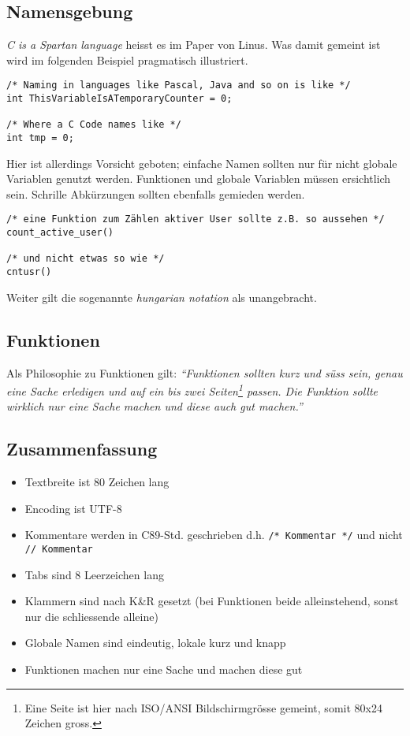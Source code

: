 \subsection{Namensgebung}
\emph{C is a Spartan language} heisst es im Paper von Linus. Was damit
gemeint ist wird im folgenden Beispiel pragmatisch illustriert.

\begin{lstlisting}
/* Naming in languages like Pascal, Java and so on is like */
int ThisVariableIsATemporaryCounter = 0;

/* Where a C Code names like */
int tmp = 0;
\end{lstlisting}

Hier ist allerdings Vorsicht geboten; einfache Namen sollten nur für nicht
globale Variablen genutzt werden. Funktionen und globale Variablen müssen
ersichtlich sein. Schrille Abkürzungen sollten ebenfalls gemieden werden.

\begin{lstlisting}
/* eine Funktion zum Zählen aktiver User sollte z.B. so aussehen */
count_active_user()

/* und nicht etwas so wie */
cntusr()
\end{lstlisting}

Weiter gilt die sogenannte \emph{hungarian notation} als unangebracht.

\subsection{Funktionen}
Als Philosophie zu Funktionen gilt: \emph{``Funktionen sollten kurz und
süss sein, genau eine Sache erledigen und auf ein bis zwei 
Seiten\footnote{
    Eine Seite ist hier nach ISO/ANSI Bildschirmgrösse gemeint, somit 
    80x24 Zeichen gross.} passen. Die Funktion sollte wirklich nur eine 
Sache machen und diese auch gut machen.''}

\subsection{Zusammenfassung}
\begin{itemize}
    \item Textbreite ist 80 Zeichen lang
    \item Encoding ist UTF-8
    \item Kommentare werden in C89-Std. geschrieben 
          d.h. \verb?/* Kommentar */? und nicht \verb?// Kommentar?
    \item Tabs sind 8 Leerzeichen lang
    \item Klammern sind nach K\&R gesetzt (bei Funktionen beide 
          alleinstehend, sonst nur die schliessende alleine)
    \item Globale Namen sind eindeutig, lokale kurz und knapp
    \item Funktionen machen nur eine Sache und machen diese gut
\end{itemize}

